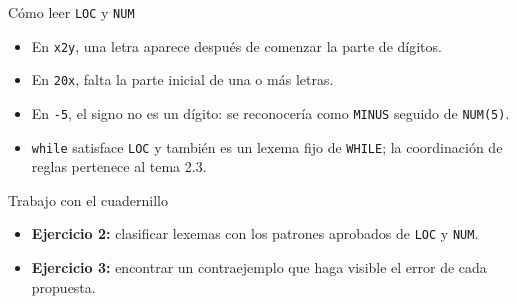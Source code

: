 \documentclass[11pt,spanish]{beamer}
\newcommand{\actividad}[1]{\textbf{\textcolor{Rojo}{#1}}}
\begin{document}
\begin{frame}{Cómo leer \texttt{LOC} y \texttt{NUM}}
\vfill

\begin{center}
\end{center}

\bigskip

\begin{itemize}
\item En \texttt{x2y}, una letra aparece después de comenzar la parte de dígitos.
\item En \texttt{20x}, falta la parte inicial de una o más letras.
\item En \texttt{-5}, el signo no es un dígito: se reconocería como \texttt{MINUS} seguido de \texttt{NUM(5)}.
\item \texttt{while} satisface \texttt{LOC} y también es un lexema fijo de \texttt{WHILE}; la coordinación de reglas pertenece al tema 2.3.
\end{itemize}

\vfill
\end{frame}

\begin{frame}{Trabajo con el cuadernillo}
\vfill

\begin{center}
\end{center}

\bigskip
\begin{itemize}
\item \textbf{Ejercicio 2:} clasificar lexemas con los patrones aprobados de \texttt{LOC} y \texttt{NUM}.
\item \textbf{Ejercicio 3:} encontrar un contraejemplo que haga visible el error de cada propuesta.
\end{itemize}

\vfill
\end{frame}
\end{document}
